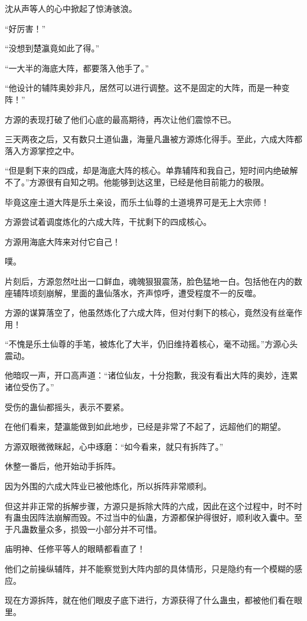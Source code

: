 \begin{this_body}
沈从声等人的心中掀起了惊涛骇浪。

“好厉害！”

“没想到楚瀛竟如此了得。”

“一大半的海底大阵，都要落入他手了。”

“他设计的辅阵奥妙非凡，居然可以进行调整。这不是固定的大阵，而是一种变阵！”

方源的表现打破了他们心底的最高期待，再次让他们震惊不已。

三天两夜之后，又有数只土道仙蛊，海量凡蛊被方源炼化得手。至此，六成大阵都落入方源掌控之中。

“但是剩下来的四成，却是海底大阵的核心。单靠辅阵和我自己，短时间内绝破解不了。”方源很有自知之明。他能够到达这里，已经是他目前能力的极限。

毕竟这座土道大阵是乐土亲设，而乐土仙尊的土道境界可是无上大宗师！

方源尝试着调度炼化的六成大阵，干扰剩下的四成核心。

方源用海底大阵来对付它自己！

噗。

片刻后，方源忽然吐出一口鲜血，魂魄狠狠震荡，脸色猛地一白。包括他在内的数座辅阵顷刻崩解，里面的蛊仙落水，齐声惊呼，遭受程度不一的反噬。

方源的谋算落空了，他虽然炼化了六成大阵，但对付剩下的核心，竟然没有丝毫作用！

“不愧是乐土仙尊的手笔，被炼化了大半，仍旧维持着核心，毫不动摇。”方源心头震动。

他暗叹一声，开口高声道：“诸位仙友，十分抱歉，我没有看出大阵的奥妙，连累诸位受伤了。”

受伤的蛊仙都摇头，表示不要紧。

在他们看来，楚瀛能做到如此地步，已经是非常了不起了，远超他们的期望。

方源双眼微微眯起，心中琢磨：“如今看来，就只有拆阵了。”

休整一番后，他开始动手拆阵。

因为外围的六成大阵业已被他炼化，所以拆阵非常顺利。

但这并非正常的拆解步骤，方源只是拆除大阵的六成，因此在这个过程中，时不时有蛊虫因阵法崩解而毁。不过当中的仙蛊，方源都保护得很好，顺利收入囊中。至于凡蛊数量众多，损毁一小部分并不可惜。

庙明神、任修平等人的眼睛都看直了！

他们之前操纵辅阵，并不能察觉到大阵内部的具体情形，只是隐约有一个模糊的感应。

现在方源拆阵，就在他们眼皮子底下进行，方源获得了什么蛊虫，都被他们看在眼里。


\end{this_body}
